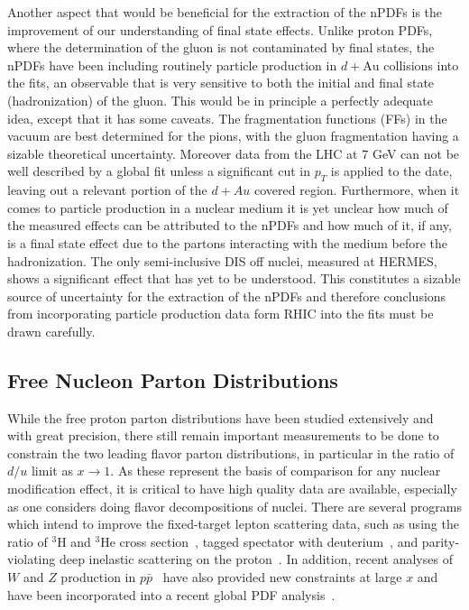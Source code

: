 Another aspect that would be beneficial for the extraction of the nPDFs is the improvement of our understanding of final state effects. Unlike proton PDFs, where the determination of the gluon is not contaminated by final states, the nPDFs have been including routinely particle production in $d+\mathrm{Au}$ collisions into the fits, an observable that is very sensitive to both the initial and final state (hadronization) of the gluon. This would be in principle a perfectly adequate idea, except that it has some caveats. The fragmentation functions (FFs) in the vacuum are best determined for the pions, with the gluon fragmentation having a sizable theoretical uncertainty. Moreover data from the LHC at $7$ GeV can not be well described by a global fit unless a significant cut in $p_{T}$ is applied to the date, leaving out a relevant portion of the $d+Au$ covered region. Furthermore, when it comes to particle production in a nuclear medium it is yet unclear how much of the measured effects can be attributed to the nPDFs and how much of it, if any, is a final state effect due to the partons interacting with the medium before the hadronization. The only semi-inclusive DIS off nuclei, measured at HERMES, shows a significant effect that has yet to be understood. This constitutes a sizable source of uncertainty for the extraction of the nPDFs and therefore conclusions from incorporating particle production data form RHIC into the fits must be drawn carefully.


\subsection{Free Nucleon Parton Distributions}

While the free proton parton distributions have been studied extensively and with great precision, there still remain important measurements to be done to constrain the two leading flavor parton distributions, in particular in the ratio of $d/u$ limit as $x \rightarrow 1$.  As these represent the basis of comparison for any nuclear modification effect, it is critical to have high quality data are available, especially as one considers doing flavor decompositions of nuclei.  There are several programs which intend to improve the fixed-target lepton scattering data, such as using the ratio of ${}^{3}$H and ${}^{3}$He cross section~\cite{mar}, tagged spectator with deuterium~\cite{bonus12}, and parity-violating deep inelastic scattering on the proton~\cite{solid_pvdis}.  In addition, recent analyses of $W$ and $Z$ production in $p\bar{p}$~\cite{D0:2014kma,Abazov:2013dsa,Acosta:2005ud,Aaltonen:2009ta,Aaltonen:2010zza,Abazov:2007jy} have also provided new constraints at large $x$ and have been incorporated into a recent global PDF analysis~\cite{Accardi:2016qay}.

